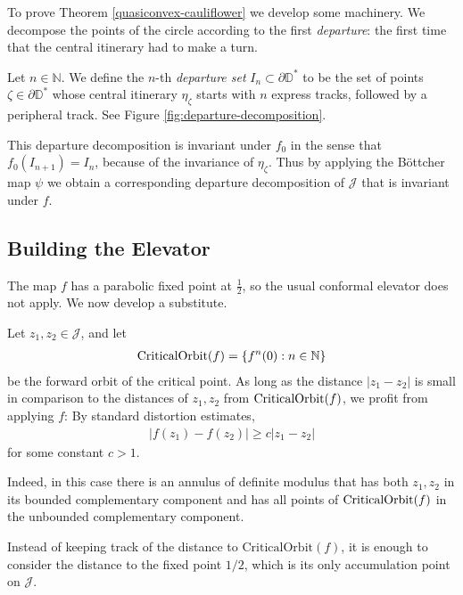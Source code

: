 To prove Theorem \ref{quasiconvex-cauliflower} we develop some machinery. We decompose the points of the circle according to 
the first \emph{departure}: the first time that the central itinerary had to make a turn.



\begin{definition}
Let $n \in \mathbb N$. We define the $n$-th \emph{departure set} $I_n \subset \partial \mathbb D ^*$ to be the set of points $\zeta \in \partial \mathbb D^*$ whose central itinerary $\eta_{\zeta}$ starts with $n$ express tracks, followed by a peripheral track.
See Figure \ref{fig:departure-decomposition}.
\end{definition}

This departure decomposition is invariant under $f_0$ in the sense that $f_0(I_{n+1})=I_n$, because of the invariance of $\eta _\zeta$.
Thus by applying the Böttcher map $\psi$ we obtain a corresponding departure decomposition of $\mathcal J$ that is invariant under $f$.

\subsection{Building the Elevator}

The map $f$ has a parabolic fixed point at $\frac 12$, so the usual conformal elevator does not apply. We now develop a substitute.

Let $z_1,z_2 \in \mathcal J$, and let
\begin{align*}
	\operatorname{CriticalOrbit}(f)=\{f^n(0): n \in \mathbb N\}
\end{align*} be the forward orbit of the critical point.
As long as the distance $|z_1-z_2|$ is small in comparison to the distances of $z_1,z_2$ from $\operatorname{CriticalOrbit}(f)$, we profit from applying $f$: By standard distortion estimates, 
\begin{align*}
|f(z_1)-f(z_2)|\geq c |z_1-z_2|
\end{align*}
for some constant $c>1$.

Indeed, in this case there is an annulus of definite modulus that has both $z_1,z_2$ in its bounded complementary component and has all points of $\operatorname{CriticalOrbit}(f)$ in the unbounded complementary component.

Instead of keeping track of the distance to $\mathrm{CriticalOrbit}(f)$, it is enough to consider the distance to the fixed point $1/2$, which is its only accumulation point on $\mathcal J$.

